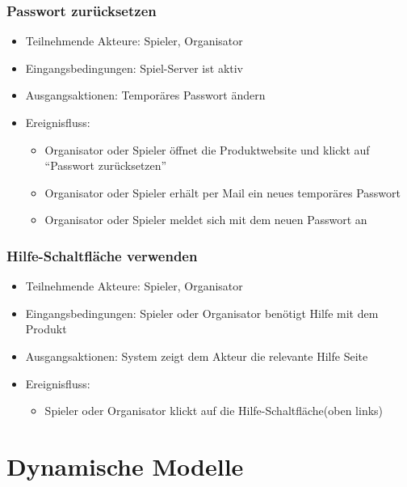 \documentclass[a4paper]{scrreprt}
\begin{document}
    \subsection{Passwort zurücksetzen}
    \begin{itemize}
        \item Teilnehmende Akteure: \Gls{Spieler}, \Gls{Organisator}
        \item Eingangsbedingungen: Spiel-Server ist aktiv
        \item Ausgangsaktionen: Temporäres Passwort ändern
        \item Ereignisfluss:
        \begin{itemize}
            \item \Gls{Organisator} oder \Gls{Spieler} öffnet die Produktwebsite und klickt auf \enquote{Passwort zurücksetzen}
            \item \Gls{Organisator} oder \Gls{Spieler} erhält per Mail ein neues temporäres Passwort
            \item \Gls{Organisator} oder \Gls{Spieler} meldet sich mit dem neuen Passwort an
        \end{itemize}
    \end{itemize}
       \subsection{Hilfe-Schaltfläche verwenden}
    \begin{itemize}
        \item Teilnehmende Akteure: \Gls{Spieler}, \Gls{Organisator}
        \item Eingangsbedingungen: \Gls{Spieler} oder \Gls{Organisator} benötigt Hilfe mit dem Produkt
        \item Ausgangsaktionen: System zeigt dem Akteur die relevante Hilfe Seite
        \item Ereignisfluss:
            \begin{itemize}
                \item \Gls{Spieler} oder \Gls{Organisator} klickt auf die Hilfe-Schaltfläche(oben links)
            \end{itemize}
    \end{itemize}


    \chapter{Dynamische Modelle}
\end{document}
